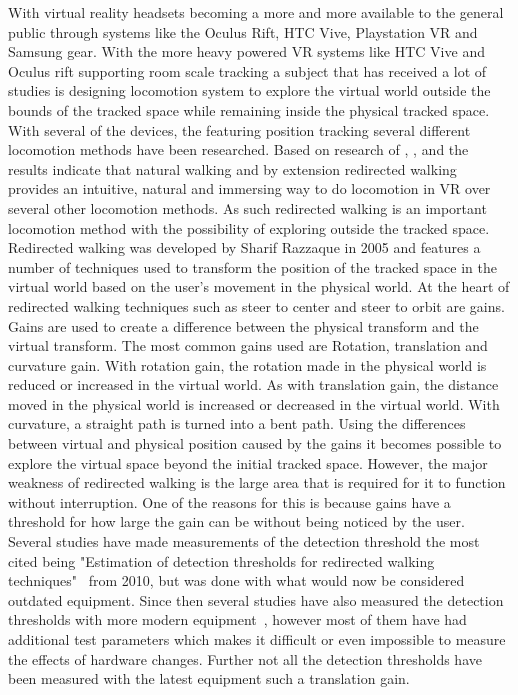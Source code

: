 With virtual reality headsets becoming a more and more available to the general public through systems like the Oculus Rift, HTC Vive, Playstation VR and Samsung gear. With the more heavy powered VR systems like HTC Vive and Oculus rift supporting room scale tracking a subject that has received a lot of studies is designing locomotion system to explore the virtual world outside the bounds of the tracked space while remaining inside the physical tracked space. With several of the devices, the featuring position tracking several different locomotion methods have been researched. Based on research of \cite{peck2012design}, \cite{ruddle2009benefits}, \cite{usoh1999walking} and \cite{nabiyouni2015comparing} the results indicate that natural walking and by extension redirected walking provides an intuitive, natural and immersing way to do locomotion in VR over several other locomotion methods. As such redirected walking is an important locomotion method with the possibility of exploring outside the tracked space. Redirected walking was developed by Sharif Razzaque in 2005\cite{razzaque2005redirected} and features a number of techniques used to transform the position of the tracked space in the virtual world based on the user's movement in the physical world. At the heart of redirected walking techniques such as steer to center and steer to orbit are gains. Gains are used to create a difference between the physical transform and the virtual transform. The most common gains used are Rotation, translation and curvature gain. With rotation gain, the rotation made in the physical world is reduced or increased in the virtual world. As with translation gain, the distance moved in the physical world is increased or decreased in the virtual world. With curvature, a straight path is turned into a bent path. Using the differences between virtual and physical position caused by the gains it becomes possible to explore the virtual space beyond the initial tracked space. However, the major weakness of redirected walking is the large area that is required for it to function without interruption. One of the reasons for this is because gains have a threshold for how large the gain can be without being noticed by the user. Several studies have made measurements of the detection threshold the most cited being "Estimation of detection thresholds for redirected walking techniques"~\cite{steinicke2010estimation} from 2010, but was done with what would now be considered outdated equipment. Since then several studies have also measured the detection thresholds with more modern equipment~\cite{meyer2016detection}, however most of them have had additional test parameters which makes it difficult or even impossible to measure the effects of hardware changes. Further not all the detection thresholds have been measured with the latest equipment such a translation gain.
\bigskip

